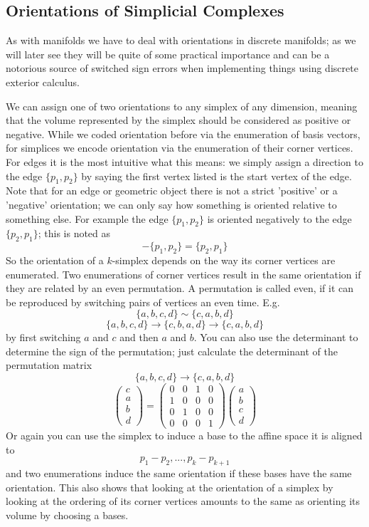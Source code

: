 \subsection{Orientations of Simplicial Complexes}
As with manifolds we have to deal with orientations in discrete manifolds; as we will later see they will be quite of some practical importance and can be a notorious source of switched sign errors when implementing things using discrete exterior calculus. 

We can assign one of two orientations to any simplex of any dimension, meaning that the volume represented by the simplex should be considered as positive or negative. While we coded orientation before via the enumeration of basis vectors, for simplices we encode orientation via the enumeration of their corner vertices.  For edges it is the most intuitive what this means: we simply assign a direction to the edge $\{p_1,p_2\}$ by saying the first vertex listed is the start vertex of the edge. Note that for an edge or geometric object there is not a strict 'positive' or a 'negative' orientation; we can only say how something is oriented relative to something else. For example the edge $\{p_1,p_2\}$ is oriented negatively to the edge $\{p_2,p_1\}$; this is noted as
\[-\{p_1,p_2\} = \{p_2,p_1\}\]
So the orientation of a $k$-simplex depends on the way its corner vertices are enumerated. Two enumerations of corner vertices result in the same orientation if they are related by an even permutation. A permutation is called even, if it can be reproduced by switching pairs of vertices an even time. E.g.
\[\{a,b,c,d\} \sim \{c,a,b,d\}\]
\[\{a,b,c,d\} \rightarrow \{c,b,a,d\}\rightarrow \{c,a,b,d\}\]
by first switching $a$ and $c$ and then $a$ and $b$.
You can also use the determinant to determine the sign of the permutation; just calculate the determinant of the permutation matrix
\[\{a,b,c,d\} \rightarrow \{c,a,b,d\}\]
\[\begin{pmatrix}c\\a\\b\\d \end{pmatrix}=\begin{pmatrix} 0 & 0 & 1 &0 \\ 1 &0&0&0 \\ 0&1&0&0 \\ 0&0&0&1 \end{pmatrix}\begin{pmatrix} a\\b\\c\\d \end{pmatrix}\]
Or again you can use the simplex to induce a base to the affine space it is aligned to
\[p_1 -p_2,...,p_{k}-p_{k+1}\]
and two enumerations induce the same orientation if these bases have the same orientation. This also shows that looking at the orientation of a simplex by looking at the ordering of its corner vertices amounts to the same as orienting its volume by choosing a bases.


